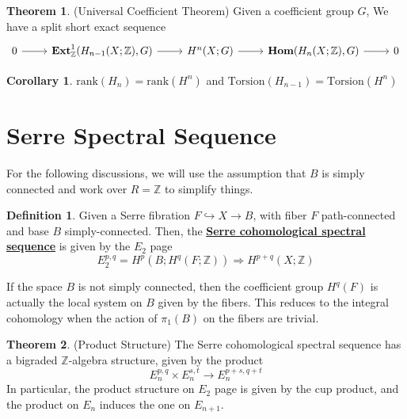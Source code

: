 \documentclass{article}
\theoremstyle{definition}
\newtheorem{theorem}{Theorem}[section]
\theoremstyle{definition}
\theoremstyle{definition}
\theoremstyle{definition}
\theoremstyle{definition}
\newtheorem{definition}{Definition}[section]
\theoremstyle{definition}
\newtheorem{corollary}{Corollary}[theorem]
\theoremstyle{definition}
\begin{document}
\begin{tcolorbox}[colback=red!5!white,colframe=red!30!white]
\begin{theorem}
    (Universal Coefficient Theorem) Given a coefficient group $G$, We have a split short exact sequence
    \[\begin{tikzcd}
    0\arrow[r]& \textbf{Ext}^1_{\mathbb{Z}}(H_{n-1}(X;\mathbb{Z}),G) \arrow[r]&H^n(X;G)\arrow[r]&\textbf{Hom}(H_n(X;\mathbb{Z}),G)\arrow[r]&0
    \end{tikzcd}\]
\end{theorem}
\end{tcolorbox}

\begin{tcolorbox}[colback=green!5!white,colframe=green!30!white]
\begin{corollary}
$\textrm{rank}(H_n)=\textrm{rank}(H^n)$ and $\textrm{Torsion}(H_{n-1})=\textrm{Torsion}(H^n)$
\end{corollary}
\end{tcolorbox}


\section{Serre Spectral Sequence}
For the following discussions, we will use the assumption that $B$ is simply connected and work over $R=\mathbb{Z}$ to simplify things. 
\begin{tcolorbox}[colback=purple!5!white,colframe=purple!75!black]
\begin{definition}
Given a Serre fibration $F\hookrightarrow X\to B$, with fiber $F$ path-connected and base $B$ simply-connected. Then, the \underline{\textbf{Serre cohomological spectral sequence}} is given by the $E_2$ page
\[
E_2^{p,q}=H ^{p}(B; H ^{q}(F; \mathbb{Z})) \Longrightarrow H ^{p+q}(X; \mathbb{Z})
\]
\end{definition}
\end{tcolorbox}
If the space $B$ is not simply connected, then the coefficient group $H ^{q}(F)$ is actually the local system on $B$ given by the fibers. This reduces to the integral cohomology when the action of $\pi_1(B)$ on the fibers are trivial.


\begin{tcolorbox}[colback=red!5!white,colframe=red!30!white]
\begin{theorem}
(Product Structure) The Serre cohomological spectral sequence has a bigraded $\mathbb{Z}$-algebra structure, given by the product 
\[
E_n^{p,q}\times E_n^{s,t}\to E_n ^{p+s,q+t}
\]
In particular, the product structure on $E_2$ page is given by the cup product, and the product on $E_n$ induces the one on $E_{n+1}$.
\end{theorem}
\end{tcolorbox}
\end{document}
